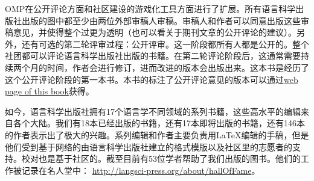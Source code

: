 OMP在公开评论方面和社区建设的游戏化工具方面进行了扩展。所有语言科学出版社出版的图中都至少由两位外部审稿人审稿。审稿人和作者可以同意出版这些审稿意见，并使得整个过更为透明（也可以看关于期刊文章的公开评论的建议）。另外，还有可选的第二轮评审过程：公开评审。这一阶段都所有人都是公开的。整个社团都可以评论语言科学出版社出版的书籍。在第二轮评论阶段后，这通常需要持续两个月的时间，作者会进行修订，进而改进的版本会出版出来。这本书是经历了这个公开评论阶段的第一本书。本书的标注了公开评论意见的版本可以通过\href{\lsURL}{web page of this book}获得。

如今，语言科学出版社拥有17个语言学不同领域的系列书籍，这些高水平的编辑来自各个大陆。我们有18本已经出版的书籍，还有17本即将出版的书籍，还有146本的作者表示出了极大的兴趣。系列编辑和作者主要负责用\LaTeX{}编辑的手稿，但是他们受到基于网络的由语言科学出版社建立的格式模版以及社区里的志愿者的支持。校对也是基于社区的。截至目前有53位学者帮助了我们出版的图书。他们的工作被记录在名人堂中： \url{http://langsci-press.org/about/hallOfFame}。

